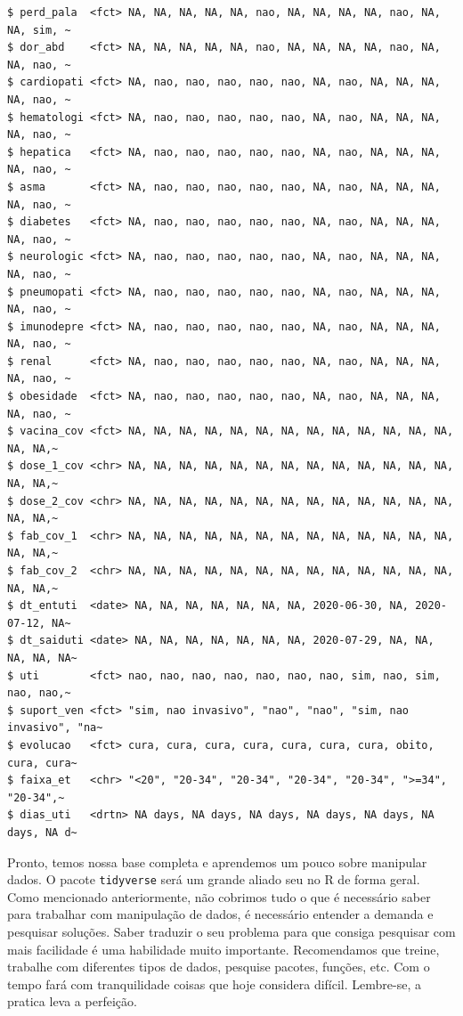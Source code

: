 \documentclass[
  letterpaper,
  DIV=11,
  numbers=noendperiod]{scrreprt}
\begin{document}
\begin{verbatim}
$ perd_pala  <fct> NA, NA, NA, NA, NA, nao, NA, NA, NA, NA, nao, NA, NA, sim, ~
$ dor_abd    <fct> NA, NA, NA, NA, NA, nao, NA, NA, NA, NA, nao, NA, NA, nao, ~
$ cardiopati <fct> NA, nao, nao, nao, nao, nao, NA, nao, NA, NA, NA, NA, nao, ~
$ hematologi <fct> NA, nao, nao, nao, nao, nao, NA, nao, NA, NA, NA, NA, nao, ~
$ hepatica   <fct> NA, nao, nao, nao, nao, nao, NA, nao, NA, NA, NA, NA, nao, ~
$ asma       <fct> NA, nao, nao, nao, nao, nao, NA, nao, NA, NA, NA, NA, nao, ~
$ diabetes   <fct> NA, nao, nao, nao, nao, nao, NA, nao, NA, NA, NA, NA, nao, ~
$ neurologic <fct> NA, nao, nao, nao, nao, nao, NA, nao, NA, NA, NA, NA, nao, ~
$ pneumopati <fct> NA, nao, nao, nao, nao, nao, NA, nao, NA, NA, NA, NA, nao, ~
$ imunodepre <fct> NA, nao, nao, nao, nao, nao, NA, nao, NA, NA, NA, NA, nao, ~
$ renal      <fct> NA, nao, nao, nao, nao, nao, NA, nao, NA, NA, NA, NA, nao, ~
$ obesidade  <fct> NA, nao, nao, nao, nao, nao, NA, nao, NA, NA, NA, NA, nao, ~
$ vacina_cov <fct> NA, NA, NA, NA, NA, NA, NA, NA, NA, NA, NA, NA, NA, NA, NA,~
$ dose_1_cov <chr> NA, NA, NA, NA, NA, NA, NA, NA, NA, NA, NA, NA, NA, NA, NA,~
$ dose_2_cov <chr> NA, NA, NA, NA, NA, NA, NA, NA, NA, NA, NA, NA, NA, NA, NA,~
$ fab_cov_1  <chr> NA, NA, NA, NA, NA, NA, NA, NA, NA, NA, NA, NA, NA, NA, NA,~
$ fab_cov_2  <chr> NA, NA, NA, NA, NA, NA, NA, NA, NA, NA, NA, NA, NA, NA, NA,~
$ dt_entuti  <date> NA, NA, NA, NA, NA, NA, NA, 2020-06-30, NA, 2020-07-12, NA~
$ dt_saiduti <date> NA, NA, NA, NA, NA, NA, NA, 2020-07-29, NA, NA, NA, NA, NA~
$ uti        <fct> nao, nao, nao, nao, nao, nao, nao, sim, nao, sim, nao, nao,~
$ suport_ven <fct> "sim, nao invasivo", "nao", "nao", "sim, nao invasivo", "na~
$ evolucao   <fct> cura, cura, cura, cura, cura, cura, cura, obito, cura, cura~
$ faixa_et   <chr> "<20", "20-34", "20-34", "20-34", "20-34", ">=34", "20-34",~
$ dias_uti   <drtn> NA days, NA days, NA days, NA days, NA days, NA days, NA d~
\end{verbatim}

Pronto, temos nossa base completa e aprendemos um pouco sobre manipular
dados. O pacote \texttt{tidyverse} será um grande aliado seu no R de
forma geral. Como mencionado anteriormente, não cobrimos tudo o que é
necessário saber para trabalhar com manipulação de dados, é necessário
entender a demanda e pesquisar soluções. Saber traduzir o seu problema
para que consiga pesquisar com mais facilidade é uma habilidade muito
importante. Recomendamos que treine, trabalhe com diferentes tipos de
dados, pesquise pacotes, funções, etc. Com o tempo fará com
tranquilidade coisas que hoje considera difícil. Lembre-se, a pratica
leva a perfeição.
\end{document}
